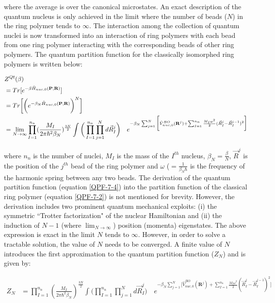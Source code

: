 \noindent where the average is over the canonical microstates. An exact description of the quantum  nucleus is only achieved in the limit where the number of beads ($N$) in the ring polymer tends to $\infty$. The interaction among the collection of quantum nuclei is now transformed into an interaction of ring polymers with each bead from one ring polymer interacting with the corresponding beads of other ring polymers. The quantum partition function for the classically isomorphed ring polymers is written below:



\begin{align}
    &Z^{Qt}(\beta)\notag\\
                 &=Tr[e^{-\beta\hat{H}_{nuc,0}(\textbf{P},\textbf{R})}]\label{QPF-7-33}\\ 
                 &=Tr\bigg[\bigg(e^{-\beta_N\hat{H}_{nuc,0}(\textbf{P},\textbf{R})}\bigg)^N\bigg]\label{QPF-7-4}\\
                 &=\lim_{N\to\infty}  \prod_{I=1}^{n_n} (\frac{M_I}{2\pi \hbar^2 \beta_N})^{\frac{3N}{2}} \int_{}^{} \bigg(\prod_{I=1}^{n_n} \prod_{j=1}^{N} d\vec{R}^{j}_{I}\bigg) \quad e^{-\beta_N \sum_{j=1}^{N}    \bigg[\hat{V}^{BO}_{nuc,0}(\textbf{R}^{j})+ \sum_{I=1}^{n_n} \frac{M_I\omega^2}{2}(\vec{R}^{j}_{I}-\vec{R}^{j-1}_{I})^2\bigg]}\label{QPF-7-2}          
\end{align}


\noindent where $n_n$ is the number of nuclei, $M_I$ is the mass of the $I^{th}$ nucleus, $\beta_N=\frac{\beta}{N}$, $\vec{R}^j$ is the position of the $j^{th}$ bead of the ring polymer  and $\omega$ ($= \frac{1}{\beta_N \hbar}$ is the frequency of the harmonic spring between any two beads. The derivation of the quantum partition function (equation \ref{QPF-7-4}) into the partition function of the classical ring polymer (equation \ref{QPF-7-2}) is not mentioned for brevity. However, the derivation includes two prominent quantum mechanical  exploits: (i) the symmetric ``Trotter factorization" of the nuclear Hamiltonian and (ii) the induction of $N-1$ (where $\lim_{N\to\infty}$) position (momenta) eigenstates. The above expression is exact in the limit $N$ tends to $\infty$. However, in order to solve a tractable solution, the value of $N$ needs to be converged. A finite value of $N$ introduces the first approximation to the quantum partition function ($Z_N$) and is given by:

\begin{align}
Z_N&=\prod_{I=1}^{n_n} (\frac{M_I}{2\pi \hbar^2 \beta_N})^{\frac{3N}{2}} \int_{}^{} \bigg(\prod_{I=1}^{n_n} \prod_{j=1}^{N} d\vec{R}^{j}_{I}\bigg) \quad e^{-\beta_N \sum_{j=1}^{N}    \bigg[\hat{V}^{BO}_{nuc,0}(\textbf{R}^{j})+ \sum_{I=1}^{n_n} \frac{M_I\omega^2}{2}(\vec{R}^{j}_{I}-\vec{R}^{j-1}_{I})^2\bigg]}\label{QPF-7-5}
\end{align}
 
